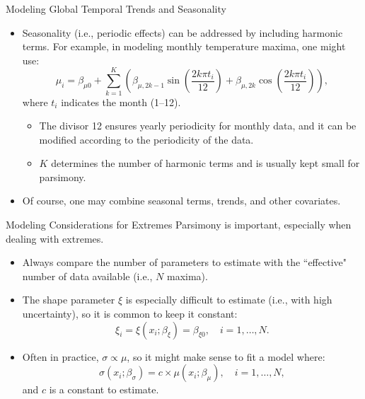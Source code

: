 \documentclass[10pt, hyperref={colorlinks = true,linkcolor = blue}]{beamer}
\begin{document}
{{{\begin{frame}{Modeling Global Temporal Trends and Seasonality}
\begin{itemize}
    \item Seasonality (i.e., periodic effects) can be addressed by including harmonic terms. For example, in modeling monthly temperature maxima, one might use:
    \[
    \mu_i = \beta_{\mu 0} + \sum_{k=1}^{K} \left( \beta_{\mu, 2k-1} \sin\left(\frac{2k\pi t_i}{12}\right) + \beta_{\mu, 2k} \cos\left(\frac{2k\pi t_i}{12}\right) \right),
    \]
    where \(t_i\) indicates the month (1–12).

    \begin{itemize}
        \item The divisor 12 ensures yearly periodicity for monthly data, and it can be modified according to the periodicity of the data.
        \item \(K\) determines the number of harmonic terms and is usually kept small for parsimony.
    \end{itemize}
     \item Of course, one may combine seasonal terms, trends, and other covariates.
\end{itemize}

\end{frame}

\begin{frame}{Modeling Considerations for Extremes}
Parsimony is important, especially when dealing with extremes.
\begin{itemize}
    \item Always compare the number of parameters to estimate with the ``effective" number of data available (i.e., \(N\) maxima).
    \item The shape parameter \(\xi\) is especially difficult to estimate (i.e., with high uncertainty), so it is common to keep it constant:
    \[
    \xi_i = \xi(x_i; \beta_\xi) = \beta_{\xi 0}, \quad i = 1, \ldots, N.
    \]
    \item Often in practice, \(\sigma \propto \mu\), so it might make sense to fit a model where:
    \[
    \sigma(x_i; \beta_\sigma) = c \times \mu(x_i; \beta_\mu), \quad i = 1, \ldots, N,
    \]
    and \(c\) is a constant to estimate.
\end{itemize}

\end{frame}


}}}
\end{document}
